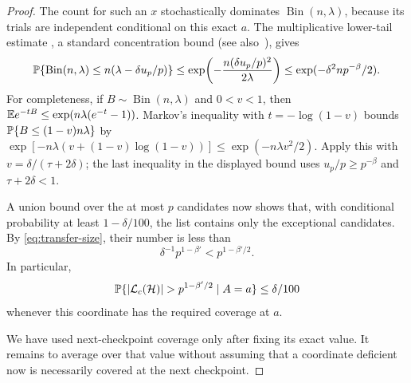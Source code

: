\begin{proof}
The count for such an $x$ stochastically dominates
$\operatorname{Bin}(n,\lambda)$, because its trials are independent
conditional on this exact $a$. The multiplicative lower-tail estimate
\cite[Exercise 8, p.~13]{Lugosi}, a standard concentration bound
(see also~\cite{BLM}), gives
\[
 \mathbb P\{\operatorname{Bin}(n,\lambda)
       \le n(\lambda-\delta u_p/p)\}
 \le\exp\!\left(-\frac{n(\delta u_p/p)^2}{2\lambda}\right)
 \le\exp(-\delta^2np^{-\beta}/2).
\]
For completeness, if $B\sim\operatorname{Bin}(n,\lambda)$ and
$0<v<1$, then
$\mathbb E e^{-tB}\le\exp(n\lambda(e^{-t}-1))$.
Markov's inequality with $t=-\log(1-v)$ bounds
$\mathbb P\{B\le(1-v)n\lambda\}$ by
$\exp[-n\lambda(v+(1-v)\log(1-v))]\le\exp(-n\lambda v^2/2)$.
Apply this with $v=\delta/(\tau+2\delta)$; the last inequality in the
displayed bound uses $u_p/p\ge p^{-\beta}$ and
$\tau+2\delta<1$.

A union bound over the at most $p$ candidates now shows that, with
conditional probability at least $1-\delta/100$, the list contains
only the exceptional candidates. By \eqref{eq:transfer-size}, their
number is less than
\[
 \delta^{-1}p^{1-\beta'}<p^{1-\beta'/2}.
\]
In particular,
\begin{equation}\label{eq:small-list}
 \Prb\{|\calL_c(\calH)|>p^{1-\beta'/2}\mid A=a\}
 \le\delta/100
\end{equation}
whenever this coordinate has the required coverage at $a$.

We have used next-checkpoint coverage only after fixing its exact value.
It remains to average over that value without assuming that a coordinate
deficient now is necessarily covered at the next checkpoint.


\end{proof}
